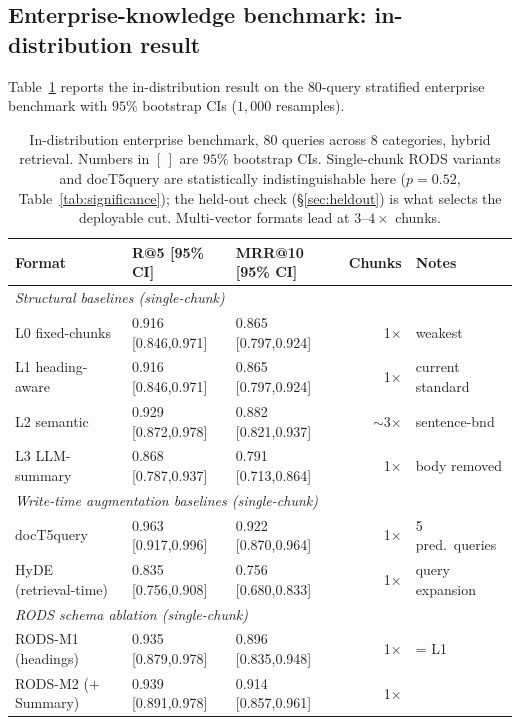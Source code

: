 \documentclass[11pt]{article}
\begin{document}
\subsection{Enterprise-knowledge benchmark: in-distribution result}
\label{sec:enterprise}

Table~\ref{tab:enterprise} reports the in-distribution result on the
$80$-query stratified enterprise benchmark with $95\%$ bootstrap CIs
($1{,}000$ resamples).

\begin{table}[t]
\centering
\caption{In-distribution enterprise benchmark, $80$ queries across $8$
  categories, hybrid retrieval. Numbers in $[\,]$ are $95\%$ bootstrap
  CIs. Single-chunk RODS variants and docT5query are statistically
  indistinguishable here ($p{=}0.52$, Table~\ref{tab:significance});
  the held-out check (\S\ref{sec:heldout}) is what selects the
  deployable cut. Multi-vector formats lead at $3$--$4{\times}$ chunks.}
\label{tab:enterprise}
\small
\begin{tabular}{lllrl}
\toprule
\textbf{Format} & \textbf{R@5 [95\% CI]} & \textbf{MRR@10 [95\% CI]}
                & \textbf{Chunks} & \textbf{Notes} \\
\midrule
\multicolumn{5}{l}{\textit{Structural baselines (single-chunk)}} \\
\midrule
L0 fixed-chunks   & 0.916 [0.846,0.971] & 0.865 [0.797,0.924] & 1$\times$ & weakest \\
L1 heading-aware  & 0.916 [0.846,0.971] & 0.865 [0.797,0.924] & 1$\times$ & current standard \\
L2 semantic       & 0.929 [0.872,0.978] & 0.882 [0.821,0.937] & $\sim$3$\times$ & sentence-bnd \\
L3 LLM-summary    & 0.868 [0.787,0.937] & 0.791 [0.713,0.864] & 1$\times$ & body removed \\
\midrule
\multicolumn{5}{l}{\textit{Write-time augmentation baselines (single-chunk)}} \\
\midrule
docT5query        & 0.963 [0.917,0.996] & 0.922 [0.870,0.964] & 1$\times$ & 5 pred.\ queries \\
HyDE (retrieval-time) & 0.835 [0.756,0.908] & 0.756 [0.680,0.833] & 1$\times$ & query expansion \\
\midrule
\multicolumn{5}{l}{\textit{RODS schema ablation (single-chunk)}} \\
\midrule
RODS-M1 (headings) & 0.935 [0.879,0.978] & 0.896 [0.835,0.948] & 1$\times$ & = L1 \\
RODS-M2 ($+$Summary) & 0.939 [0.891,0.978] & 0.914 [0.857,0.961] & 1$\times$ & \\

\end{tabular}
\end{table}
\end{document}
